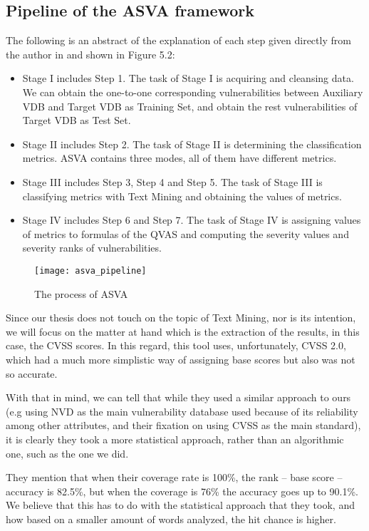 \subsection{Pipeline of the ASVA framework}

The following is an abstract of the explanation of each step given directly from the author in \parencite{novelty} and shown in Figure 5.2:

\begin{itemize}
	\item Stage I includes Step 1. The task of Stage I is acquiring and cleansing data. We can obtain the one-to-one corresponding vulnerabilities between Auxiliary VDB and Target VDB as Training Set, and obtain the rest vulnerabilities of Target VDB as Test Set.
	\item Stage II includes Step 2. The task of Stage II is determining the classification metrics. ASVA contains three modes, all of them have different metrics.
	\item Stage III includes Step 3, Step 4 and Step 5. The task of Stage III is classifying metrics with Text Mining and obtaining the values of metrics.
	\item Stage IV includes Step 6 and Step 7. The task of Stage IV is assigning values of metrics to formulas of the QVAS and computing the severity values and severity ranks of vulnerabilities.
\end{itemize}

\begin{figure}[!htb]
	\caption{The process of ASVA}
	\centering
	\texttt{[image: asva\_pipeline]}
\end{figure}

Since our thesis does not touch on the topic of Text Mining, nor is its intention, we will focus on the matter at hand which is the extraction of the results, in this case, the CVSS scores. In this regard, this tool uses, unfortunately, CVSS 2.0, which had a much more simplistic way of assigning base scores but also was not so accurate. 

With that in mind, we can tell that while they used a similar approach to ours (e.g using NVD as the main vulnerability database used because of its reliability among other attributes, and their fixation on using CVSS as the main standard), it is clearly they took a more statistical approach, rather than an algorithmic one, such as the one we did.

They mention that when their coverage rate is 100\%, the rank -- base score -- accuracy is 82.5\%, but when the coverage is 76\% the accuracy goes up to 90.1\%. We believe that this has to do with the statistical approach that they took, and how based on a smaller amount of words analyzed, the hit chance is higher.

